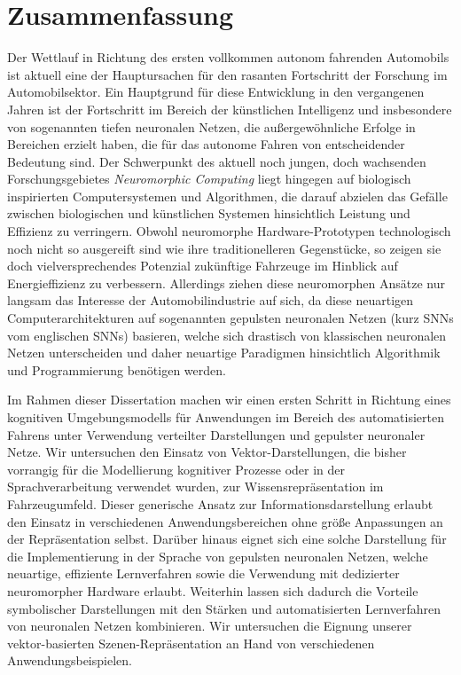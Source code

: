 \chapter*{Zusammenfassung}

Der Wettlauf in Richtung des ersten vollkommen autonom fahrenden Automobils ist aktuell eine der Hauptursachen f\"ur den rasanten Fortschritt der Forschung im Automobilsektor.
Ein Hauptgrund f\"ur diese Entwicklung in den vergangenen Jahren ist der Fortschritt im Bereich der k\"unstlichen Intelligenz und insbesondere von sogenannten tiefen neuronalen Netzen, die au{\ss}ergew\"ohnliche Erfolge in Bereichen erzielt haben, die f\"ur das autonome Fahren von entscheidender Bedeutung sind.
Der Schwerpunkt des aktuell noch jungen, doch wachsenden Forschungsgebietes \emph{Neuromorphic Computing} liegt hingegen auf biologisch inspirierten Computersystemen und Algorithmen, die darauf abzielen das Gef\"alle zwischen biologischen und k\"unstlichen Systemen hinsichtlich Leistung und Effizienz zu verringern.
Obwohl neuromorphe Hardware-Prototypen technologisch noch nicht so ausgereift sind wie ihre traditionelleren Gegenst\"ucke, so zeigen sie doch vielversprechendes Potenzial zuk\"unftige Fahrzeuge im Hinblick auf Energieffizienz zu verbessern.
Allerdings ziehen diese neuromorphen Ans\"atze nur langsam das Interesse der Automobilindustrie auf sich, da diese neuartigen Computerarchitekturen auf sogenannten gepulsten neuronalen Netzen (kurz \acsp{SNN} vom englischen \aclp{SNN}) basieren, welche sich drastisch von klassischen neuronalen Netzen unterscheiden und daher neuartige Paradigmen hinsichtlich Algorithmik und Programmierung ben\"otigen werden.

Im Rahmen dieser Dissertation machen wir einen ersten Schritt in Richtung eines kognitiven Umgebungsmodells f\"ur Anwendungen im Bereich des automatisierten Fahrens unter Verwendung verteilter Darstellungen und gepulster neuronaler Netze.
Wir untersuchen den Einsatz von Vektor-Darstellungen, die bisher vorrangig f\"ur die Modellierung kognitiver Prozesse oder in der Sprachverarbeitung verwendet wurden, zur Wissensrepr\"asentation im Fahrzeugumfeld.
Dieser generische Ansatz zur Informationsdarstellung erlaubt den Einsatz in verschiedenen Anwendungsbereichen ohne gr\"o{\ss}e Anpassungen an der Repr\"asentation selbst.
Dar\"uber hinaus eignet sich eine solche Darstellung f\"ur die Implementierung in der Sprache von gepulsten neuronalen Netzen, welche neuartige, effiziente Lernverfahren sowie die Verwendung mit dedizierter neuromorpher Hardware erlaubt.
Weiterhin lassen sich dadurch die Vorteile symbolischer Darstellungen mit den St\"arken und automatisierten Lernverfahren von neuronalen Netzen kombinieren.
Wir untersuchen die Eignung unserer vektor-basierten Szenen-Repr\"asentation an Hand von verschiedenen Anwendungsbeispielen.

